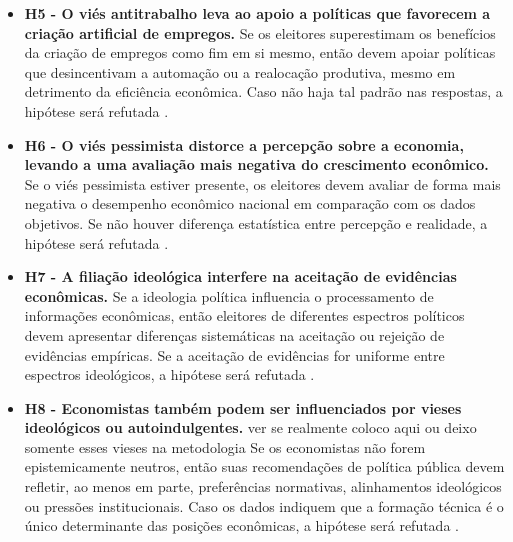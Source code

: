 \begin{itemize}
    \item \textbf{H5 - O viés antitrabalho leva ao apoio a políticas que favorecem a criação artificial de empregos.}  
    Se os eleitores superestimam os benefícios da criação de empregos como fim em si mesmo, então devem apoiar políticas que desincentivam a automação ou a realocação produtiva, mesmo em detrimento da eficiência econômica. Caso não haja tal padrão nas respostas, a hipótese será refutada \cite{The_Myth_of_the_Rational_Voter, landsburg2012armchair}.  

    \item \textbf{H6 - O viés pessimista distorce a percepção sobre a economia, levando a uma avaliação mais negativa do crescimento econômico.}  
    Se o viés pessimista estiver presente, os eleitores devem avaliar de forma mais negativa o desempenho econômico nacional em comparação com os dados objetivos. Se não houver diferença estatística entre percepção e realidade, a hipótese será refutada \cite{The_Myth_of_the_Rational_Voter, easterbrook2004progress}.  

    \item \textbf{H7 - A filiação ideológica interfere na aceitação de evidências econômicas.}  
    Se a ideologia política influencia o processamento de informações econômicas, então eleitores de diferentes espectros políticos devem apresentar diferenças sistemáticas na aceitação ou rejeição de evidências empíricas. Se a aceitação de evidências for uniforme entre espectros ideológicos, a hipótese será refutada \cite{The_Myth_of_the_Rational_Voter, kahan2012polarization}.  

    \item \textbf{H8 - Economistas também podem ser influenciados por vieses ideológicos ou autoindulgentes.}  ver se realmente coloco aqui ou deixo somente esses vieses na metodologia 
    Se os economistas não forem epistemicamente neutros, então suas recomendações de política pública devem refletir, ao menos em parte, preferências normativas, alinhamentos ideológicos ou pressões institucionais. Caso os dados indiquem que a formação técnica é o único determinante das posições econômicas, a hipótese será refutada \cite{The_Myth_of_the_Rational_Voter, Hausman_McPherson_Satz_2016}.  

\end{itemize}


